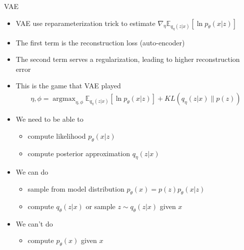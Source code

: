 \documentclass[compress]{beamer}
\newcommand{\expects}[2]{\mathbb{E}_{#1} \left[ #2 \right]}
\begin{document}
\begin{frame}[allowframebreaks]{VAE}
\begin{itemize}
        \item VAE use reparameterization trick to estimate $\nabla_\eta \expects{q_{\eta}(z|x)}{\ln p_{\theta}(x|z)}$
        \item The first term is the reconstruction loss (auto-encoder)
        \item The second term serves a regularization, leading to higher reconstruction error
    \end{itemize}
    \framebreak
    \begin{itemize}
        \item This is the game that VAE played
            \begin{align*}
                \eta, \phi = \mathop{argmax}_{\eta, \phi} \expects{q_{\eta}(z|x)}{\ln p_{\theta}(x|z)} + KL(q_{\eta}(z|x)\|p(z))
            \end{align*}
        \item We need to be able to
            \begin{itemize}
                \item compute likelihood $p_\theta(x|z)$
                \item compute posterior approximation $q_{\eta}(z|x)$
            \end{itemize}
        \item We can do
            \begin{itemize}
                \item sample from model distribution $p_\theta(x)=p(z)p_\theta(x|z)$
                \item compute $q_{\theta}(z|x)$ or sample $z\sim q_{\theta}(z|x)$ given $x$
            \end{itemize}
        \item We can't do
            \begin{itemize}
                \item compute $p_{\theta}(x)$ given $x$
            \end{itemize}
    \end{itemize}
\end{frame}
\end{document}

